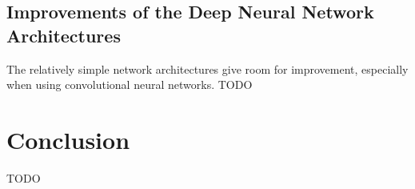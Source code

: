 \subsection{Improvements of the Deep Neural Network Architectures}
The relatively simple network architectures give room for improvement, especially when using convolutional neural networks.
TODO

\section{Conclusion}
\label{sec:conclusion}
TODO

\newpage



